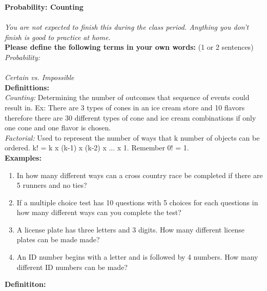 \documentclass[12pt]{article}
\begin{document}
 \textbf{Probability: Counting} \\
\\
\textit{You are not expected to finish this during the class period. Anything you don't finish is good to practice at home.}  \\ [5pt]

\textbf{Please define the following terms in your own words:} (1 or 2 sentences) \\ [5pt]

  \textit{Probability:} \\
\\
\textit{Certain vs. Impossible}\\

\textbf{Definittions:}  \\ [5pt]
\textit{Counting: } Determining the number of outcomes that sequence of events could result in.  Ex: There are 3 types of cones in an ice cream store and 10 flavors therefore there are 30 different types of cone and ice cream combinations if only one cone and one flavor is chosen.\\  [12pt]

\textit{Factorial: }Used to represent the number of ways that k number of objects can be ordered. k! = k x (k-1) x (k-2) x ... x 1.  Remember 0! = 1. \\ [12pt]


 \textbf{Examples:}

\begin{enumerate}
\item In how many different ways can a cross country race be completed if there are 5 runners and no ties?\\

\item If a multiple choice test has 10 questions with 5 choices for each questions in how many different ways can you complete the test?\\

\item A license plate has three letters and 3 digits. How many different license plates can be made made? \\

\item An ID number begins with a letter and is followed by 4 numbers. How many different ID numbers can be made? \\
\end{enumerate}

\textbf{Definititon:}\\
\end{document}
